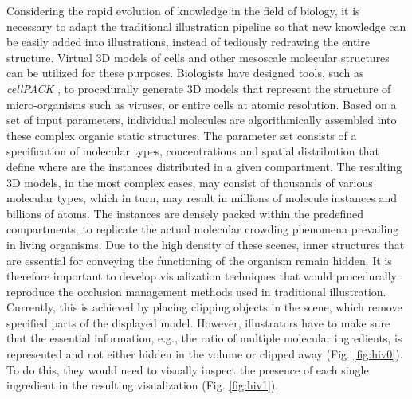 Considering the rapid evolution of knowledge in the field of biology, it is necessary to adapt the traditional illustration pipeline so that new knowledge can be easily added into illustrations, instead of tediously redrawing the entire structure.
Virtual 3D models of cells and other mesoscale molecular structures can be utilized for these purposes.
Biologists have designed tools, such as \emph{cellPACK} \cite{cellpack}, to procedurally generate 3D models that represent the structure of micro-organisms such as viruses, or entire cells at atomic resolution.
Based on a set of input parameters, individual molecules are algorithmically assembled into these complex organic static structures. 
The parameter set consists of a specification of molecular types, concentrations and spatial distribution that define where are the instances distributed in a given compartment. 
The resulting 3D models, in the most complex cases, may consist of thousands of various molecular types, which in turn, may result in millions of molecule instances and billions of atoms.
The instances are densely packed within the predefined compartments, to replicate the actual molecular crowding phenomena prevailing in living organisms.
Due to the high density of these scenes, inner structures that are essential for conveying the functioning of the organism remain hidden.
It is therefore important to develop visualization techniques that would procedurally reproduce the occlusion management methods used in traditional illustration.
Currently, this is achieved by placing clipping objects in the scene, which remove specified parts of the displayed model. 
However, illustrators have to make sure that the essential information, e.g., the ratio of multiple molecular ingredients, is represented and not either hidden in the volume or clipped away (Fig. \ref{fig:hiv0}). 
To do this, they would need to visually inspect the presence of each single ingredient in the resulting visualization (Fig. \ref{fig:hiv1}).

